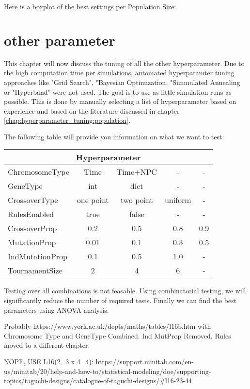 Here is a boxplot of the best settings per Population Size:


\section{other parameter}
\label{chap:hyperparameter_tuning:other_parameter}

This chapter will now discuss the tuning of all the other hyperparameter. 
Due to the high computation time per simulations, automated hyperparamter tuning approaches like "Grid Search", "Bayesian Optimization, "Simmulated Annealing or "Hyperband" were not used. 
The goal is to use as little simulation runs as possible. This is done by manually selecting a list of hyperparameter based on experience and based on the literature discussed in chapter \ref{chap:hyperparameter_tuning:population}. 


The following table will provide you information on what we want to test:

\begin{tabular}{ |l||c|c|c|c|  }
	\hline
	\multicolumn{5}{|c|}{ Hyperparameter } \\
	\hline
	ChromosomeType   	& Time & Time+NPC & - & -\\
	GeneType			& int & dict & - & -\\
	CrossoverType 		& one point & two point & uniform & -\\
	RulesEnabled    	& true & false & - & -\\
	CrossoverProp    	& 0.2 & 0.5 & 0.8 & 0.9\\
	MutationProp   		& 0.01 & 0.1 & 0.3 & 0.5\\
	IndMutationProp		& 0.1 & 0.5 & 1.0 & -\\
	TournamentSize 		& 2 & 4 & 6 & -\\
	\hline
\end{tabular}

Testing over all combinations is not feasable. Using combinatorial testing, we will signifficantly reduce the number of required tests. Finally we can find the best parameters using ANOVA analysis.

Probably https://www.york.ac.uk/depts/maths/tables/l16b.htm with Chromosome Type and GeneType Combined. Ind MutProp Removed. Rules moved to a different chapter.

NOPE, USE L16(2_3 x 4_4): https://support.minitab.com/en-us/minitab/20/help-and-how-to/statistical-modeling/doe/supporting-topics/taguchi-designs/catalogue-of-taguchi-designs/#l16-23-44

